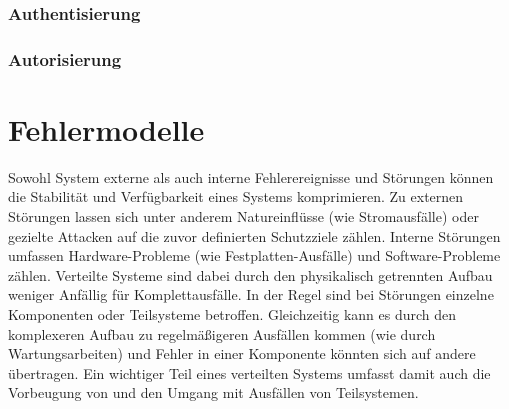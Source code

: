 \documentclass[12pt,a4paper,parskip=half]{scrreprt}
\begin{document}
\subsection{Authentisierung}


\subsection{Autorisierung}


\chapter{Fehlermodelle}
Sowohl System externe als auch interne Fehlerereignisse und Störungen können die Stabilität und Verfügbarkeit eines Systems komprimieren. Zu externen Störungen lassen sich unter anderem Natureinflüsse (wie Stromausfälle) oder gezielte Attacken auf die zuvor definierten Schutzziele zählen. Interne Störungen umfassen Hardware-Probleme (wie Festplatten-Ausfälle) und Software-Probleme zählen. Verteilte Systeme sind dabei durch den physikalisch getrennten Aufbau weniger Anfällig für Komplettausfälle. In der Regel sind bei Störungen einzelne Komponenten oder Teilsysteme betroffen. Gleichzeitig kann es durch den komplexeren Aufbau zu regelmäßigeren Ausfällen kommen (wie durch Wartungsarbeiten) und Fehler in einer Komponente könnten sich auf andere übertragen. Ein wichtiger Teil eines verteilten Systems umfasst damit auch die Vorbeugung von und den Umgang mit Ausfällen von Teilsystemen.
\end{document}
